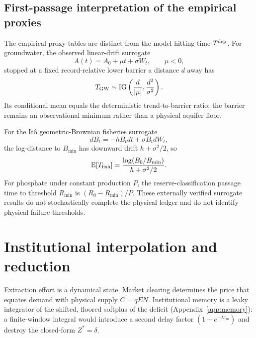 \documentclass[11pt]{article}
\theoremstyle{definition}
\begin{document}
\subsection{First-passage interpretation of the empirical proxies}
\label{sec:first-passage-bridge}

The empirical proxy tables are distinct from the model hitting time $T^{\rm dep}$. For groundwater, the observed linear-drift surrogate
\[
A(t)=A_0+\mu t+\sigma W_t,
\qquad \mu<0,
\]
stopped at a fixed record-relative lower barrier a distance $d$ away has
\[
T_{\rm GW}\sim \operatorname{IG}
\left(\frac d{|\mu|},\frac{d^2}{\sigma^2}\right).
\]
Its conditional mean equals the deterministic trend-to-barrier ratio; the barrier remains an observational minimum rather than a physical aquifer floor.

For the It\^o geometric-Brownian fisheries surrogate
\[
dB_t=-hB_tdt+\sigma B_t dW_t,
\]
the log-distance to $B_{\min}$ has downward drift $h+\sigma^2/2$, so
\[
\mathbb E[T_{\rm fish}]
=\frac{\log(B_0/B_{\min})}{h+\sigma^2/2}.
\]
For phosphate under constant production $P$, the reserve-classification passage time to threshold $R_{\min}$ is $(R_0-R_{\min})/P$. These externally verified surrogate results do not stochastically complete the physical ledger and do not identify physical failure thresholds.

\section{Institutional interpolation and reduction}
\label{sec:economic-layer}

Extraction effort is a dynamical state. Market clearing determines the price that equates demand with physical supply $C=qEN$. Institutional memory is a leaky integrator of the shifted, floored softplus of the deficit (Appendix~\ref{app:memory}): a finite-window integral would introduce a second delay factor $(1-e^{-\lambda\tau_m})$ and destroy the closed-form $Z^*=\delta$.
\end{document}
